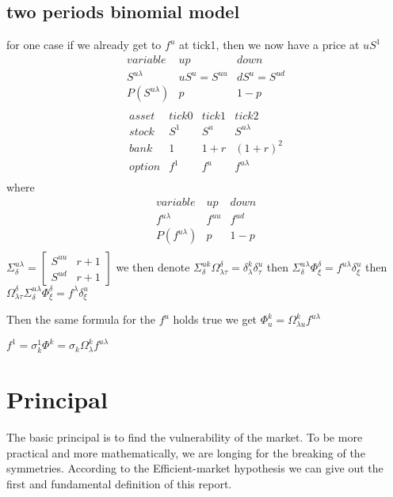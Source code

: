 \documentclass{article}
\theoremstyle{definition} %
\begin{document}
\subsection{two periods binomial model}
for one case if we already get to $f^u$
at tick1, then we now have a price at
$uS^1$
$$
    \begin{array}{c|ccc}
        variable        & up          & down        \\
        S^{u\lambda}    & uS^u=S^{uu} & dS^u=S^{ud} \\
        \hline
        P(S^{u\lambda}) & p           & 1-p         \\
    \end{array}
$$
$$
    \begin{array}{c|ccc}
        asset  & tick0 & tick1 & tick2        \\
        stock  & S^1   & S^u   & S^{u\lambda} \\
        \hline
        bank   & 1     & 1+r   & (1+r)^2      \\
        \hline
        option & f^1   & f^u   & f^{u\lambda} \\
    \end{array}
$$
where
$$
    \begin{array}{c|ccc}
        variable        & up     & down   \\
        f^{u\lambda}    & f^{uu} & f^{ud} \\
        \hline
        P(f^{u\lambda}) & p      & 1-p    \\
    \end{array}
$$
$\Sigma^{u\lambda}_\delta=
    \begin{bmatrix}
        S^{uu} & r+1 \\
        S^{ud} & r+1
    \end{bmatrix}
$
we then denote $\Sigma^{uk}_\delta \Omega_{\lambda\tau}^\delta=\delta^k_\lambda\delta^u_\tau$
then
$\Sigma^{u\lambda}_\delta \Phi^\delta_\xi=f^{u\lambda}\delta^u_\xi$
then
$\Omega_{\lambda\tau}^\delta\Sigma^{u\lambda}_\delta \Phi^\delta_\xi=f^\lambda\delta^u_\xi$

Then the same formula for the $f^u$ holds true
we get
$\Phi^k_u=\Omega_{\lambda u}^kf^{u\lambda}$

$f^1=\sigma^1_k\Phi^k=\sigma_k\Omega_\lambda^kf^{u\lambda}$



\section{Principal}
The basic principal is to find the vulnerability
of the market. To be more practical and more
mathematically, we are longing for the breaking
of the symmetries. According to the
Efficient-market hypothesis\cite[Hypothesis]{EMH}
we can give out the first and fundamental
definition of this report.
\end{document}
